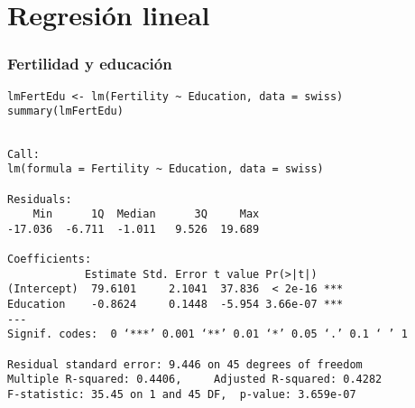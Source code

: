 \documentclass[bigger]{beamer}
\begin{document}
\section{Regresión lineal}
\label{sec-3}
\begin{frame}[fragile]
\frametitle{Fertilidad y educación}
\label{sec-3-1}


\lstset{language=R}
\begin{lstlisting}
lmFertEdu <- lm(Fertility ~ Education, data = swiss)
summary(lmFertEdu)
\end{lstlisting}


\begin{verbatim}

Call:
lm(formula = Fertility ~ Education, data = swiss)

Residuals:
    Min      1Q  Median      3Q     Max 
-17.036  -6.711  -1.011   9.526  19.689 

Coefficients:
            Estimate Std. Error t value Pr(>|t|)    
(Intercept)  79.6101     2.1041  37.836  < 2e-16 ***
Education    -0.8624     0.1448  -5.954 3.66e-07 ***
---
Signif. codes:  0 ‘***’ 0.001 ‘**’ 0.01 ‘*’ 0.05 ‘.’ 0.1 ‘ ’ 1 

Residual standard error: 9.446 on 45 degrees of freedom
Multiple R-squared: 0.4406,     Adjusted R-squared: 0.4282 
F-statistic: 35.45 on 1 and 45 DF,  p-value: 3.659e-07
\end{verbatim}
\end{frame}
\end{document}
